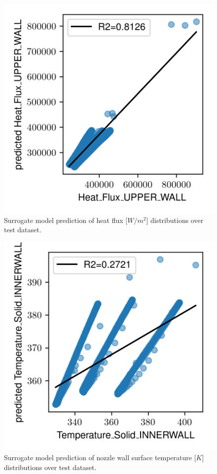 \documentclass[10pt,oneside,a4paper,twocolumn]{article}
\begin{document}
\begin{figure}[htbp]
  \centering
  \includegraphics[width=\columnwidth]{figures/results/Heat_Flux_UPPER_WALL.png}
  \caption{Surrogate model prediction of heat flux [$W/m^2$] distributions over test dataset.}
  \label{fig:r2_heat_flux}
\end{figure}

\begin{figure}[htbp]
  \centering
  \includegraphics[width=\columnwidth]{figures/results/Temperature_Solid_INNERWALL.png}
  \caption{Surrogate model prediction of nozzle wall surface temperature [$K$] distributions over test dataset.}
  \label{fig:r2_temperature_solid_wall}
\end{figure}
\end{document}
